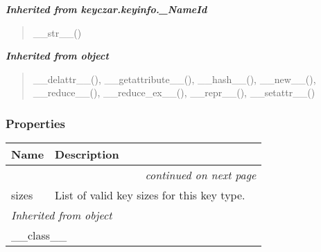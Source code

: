 \large{\textbf{\textit{Inherited from keyczar.keyinfo.\_NameId}}}

\begin{quote}
\_\_str\_\_()
\end{quote}

\large{\textbf{\textit{Inherited from object}}}

\begin{quote}
\_\_delattr\_\_(), \_\_getattribute\_\_(), \_\_hash\_\_(), \_\_new\_\_(), \_\_reduce\_\_(), \_\_reduce\_ex\_\_(), \_\_repr\_\_(), \_\_setattr\_\_()
\end{quote}


  \subsubsection{Properties}

    \vspace{-1cm}
\hspace{\varindent}\begin{longtable}{|p{\varnamewidth}|p{\vardescrwidth}|l}
\cline{1-2}
\cline{1-2} \centering \textbf{Name} & \centering \textbf{Description}& \\
\cline{1-2}
\endhead\cline{1-2}\multicolumn{3}{r}{\small\textit{continued on next page}}\\\endfoot\cline{1-2}
\endlastfoot\raggedright s\-i\-z\-e\-s\- & \raggedright List of valid key sizes for this key type.&\\
\cline{1-2}
\multicolumn{2}{|l|}{\textit{Inherited from object}}\\
\multicolumn{2}{|p{\varwidth}|}{\raggedright \_\_class\_\_}\\
\cline{1-2}
\end{longtable}




